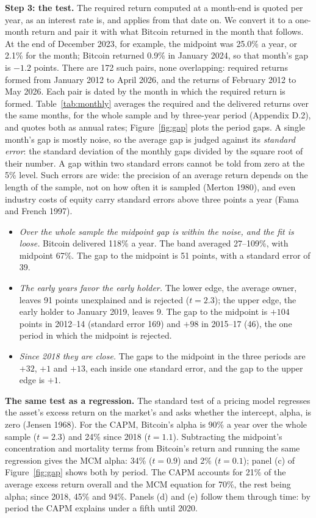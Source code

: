 \documentclass[11pt]{article}
\begin{document}
\textbf{Step 3: the test.} The required return computed at a month-end is quoted per year, as an interest rate is, and applies from that date on. We convert it to a one-month return and pair it with what Bitcoin returned in the month that follows. At the end of December 2023, for example, the midpoint was 25.0\% a year, or 2.1\% for the month; Bitcoin returned 0.9\% in January 2024, so that month's gap is $-1.2$ points. There are 172 such pairs, none overlapping: required returns formed from January 2012 to April 2026, and the returns of February 2012 to May 2026. Each pair is dated by the month in which the required return is formed. Table~\ref{tab:monthly} averages the required and the delivered returns over the same months, for the whole sample and by three-year period (Appendix D.2), and quotes both as annual rates; Figure~\ref{fig:gap} plots the period gaps. A single month's gap is mostly noise, so the average gap is judged against its \emph{standard error}: the standard deviation of the monthly gaps divided by the square root of their number. A gap within two standard errors cannot be told from zero at the 5\% level. Such errors are wide: the precision of an average return depends on the length of the sample, not on how often it is sampled (Merton 1980), and even industry costs of equity carry standard errors above three points a year (Fama and French 1997).
\begin{itemize}
\item \emph{Over the whole sample the midpoint gap is within the noise, and the fit is loose.} Bitcoin delivered 118\% a year. The band averaged 27--109\%, with midpoint 67\%. The gap to the midpoint is 51 points, with a standard error of 39.
\item \emph{The early years favor the early holder.} The lower edge, the average owner, leaves 91 points unexplained and is rejected ($t = 2.3$); the upper edge, the early holder to January 2019, leaves 9. The gap to the midpoint is $+104$ points in 2012--14 (standard error 169) and $+98$ in 2015--17 (46), the one period in which the midpoint is rejected.
\item \emph{Since 2018 they are close.} The gaps to the midpoint in the three periods are $+32$, $+1$ and $+13$, each inside one standard error, and the gap to the upper edge is $+1$.
\end{itemize}
\textbf{The same test as a regression.} The standard test of a pricing model regresses the asset's excess return on the market's and asks whether the intercept, alpha, is zero (Jensen 1968). For the CAPM, Bitcoin's alpha is 90\% a year over the whole sample ($t = 2.3$) and 24\% since 2018 ($t = 1.1$). Subtracting the midpoint's concentration and mortality terms from Bitcoin's return and running the same regression gives the MCM alpha: 34\% ($t = 0.9$) and 2\% ($t = 0.1$); panel (c) of Figure~\ref{fig:gap} shows both by period. The CAPM accounts for 21\% of the average excess return overall and the MCM equation for 70\%, the rest being alpha; since 2018, 45\% and 94\%. Panels (d) and (e) follow them through time: by period the CAPM explains under a fifth until 2020.
\end{document}
